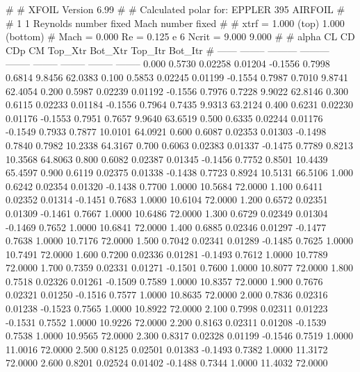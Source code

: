 #  
#       XFOIL         Version 6.99
#  
# Calculated polar for: EPPLER 395 AIRFOIL                              
#  
# 1 1 Reynolds number fixed          Mach number fixed         
#  
# xtrf =   1.000 (top)        1.000 (bottom)  
# Mach =   0.000     Re =     0.125 e 6     Ncrit =   9.000  9.000
#  
#   alpha    CL        CD       CDp       CM     Top_Xtr  Bot_Xtr  Top_Itr  Bot_Itr
#  ------ -------- --------- --------- -------- -------- -------- -------- --------
   0.000   0.5730   0.02258   0.01204  -0.1556   0.7998   0.6814   9.8456  62.0383
   0.100   0.5853   0.02245   0.01199  -0.1554   0.7987   0.7010   9.8741  62.4054
   0.200   0.5987   0.02239   0.01192  -0.1556   0.7976   0.7228   9.9022  62.8146
   0.300   0.6115   0.02233   0.01184  -0.1556   0.7964   0.7435   9.9313  63.2124
   0.400   0.6231   0.02230   0.01176  -0.1553   0.7951   0.7657   9.9640  63.6519
   0.500   0.6335   0.02244   0.01176  -0.1549   0.7933   0.7877  10.0101  64.0921
   0.600   0.6087   0.02353   0.01303  -0.1498   0.7840   0.7982  10.2338  64.3167
   0.700   0.6063   0.02383   0.01337  -0.1475   0.7789   0.8213  10.3568  64.8063
   0.800   0.6082   0.02387   0.01345  -0.1456   0.7752   0.8501  10.4439  65.4597
   0.900   0.6119   0.02375   0.01338  -0.1438   0.7723   0.8924  10.5131  66.5106
   1.000   0.6242   0.02354   0.01320  -0.1438   0.7700   1.0000  10.5684  72.0000
   1.100   0.6411   0.02352   0.01314  -0.1451   0.7683   1.0000  10.6104  72.0000
   1.200   0.6572   0.02351   0.01309  -0.1461   0.7667   1.0000  10.6486  72.0000
   1.300   0.6729   0.02349   0.01304  -0.1469   0.7652   1.0000  10.6841  72.0000
   1.400   0.6885   0.02346   0.01297  -0.1477   0.7638   1.0000  10.7176  72.0000
   1.500   0.7042   0.02341   0.01289  -0.1485   0.7625   1.0000  10.7491  72.0000
   1.600   0.7200   0.02336   0.01281  -0.1493   0.7612   1.0000  10.7789  72.0000
   1.700   0.7359   0.02331   0.01271  -0.1501   0.7600   1.0000  10.8077  72.0000
   1.800   0.7518   0.02326   0.01261  -0.1509   0.7589   1.0000  10.8357  72.0000
   1.900   0.7676   0.02321   0.01250  -0.1516   0.7577   1.0000  10.8635  72.0000
   2.000   0.7836   0.02316   0.01238  -0.1523   0.7565   1.0000  10.8922  72.0000
   2.100   0.7998   0.02311   0.01223  -0.1531   0.7552   1.0000  10.9226  72.0000
   2.200   0.8163   0.02311   0.01208  -0.1539   0.7538   1.0000  10.9565  72.0000
   2.300   0.8317   0.02328   0.01199  -0.1546   0.7519   1.0000  11.0016  72.0000
   2.500   0.8125   0.02501   0.01383  -0.1493   0.7382   1.0000  11.3172  72.0000
   2.600   0.8201   0.02524   0.01402  -0.1488   0.7344   1.0000  11.4032  72.0000
